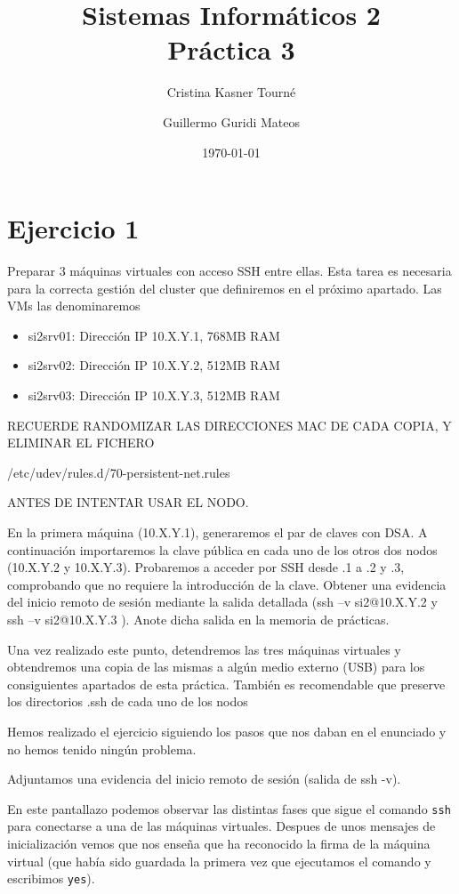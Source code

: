 \documentclass[a4paper, 10pt]{article}
\title{Sistemas Informáticos 2\\Práctica 3}
\author{Cristina Kasner Tourné\and Guillermo Guridi Mateos}
\date{\today}
\begin{document}


\section{Ejercicio 1}
\begin{mdframed}
	Preparar 3 máquinas virtuales con acceso SSH entre ellas. Esta tarea es necesaria para la
	correcta gestión del cluster que definiremos en el próximo apartado. Las VMs las denominaremos
	\begin{itemize}
		\item si2srv01: Dirección IP 10.X.Y.1, 768MB RAM
		\item si2srv02: Dirección IP 10.X.Y.2, 512MB RAM
		\item si2srv03: Dirección IP 10.X.Y.3, 512MB RAM 
	\end{itemize}
	
	RECUERDE RANDOMIZAR LAS DIRECCIONES MAC DE CADA COPIA, Y ELIMINAR EL FICHERO 
	
	/etc/udev/rules.d/70-persistent-net.rules 
	
	ANTES DE INTENTAR USAR EL NODO.
	
	
	En la primera máquina (10.X.Y.1), generaremos el par de claves con DSA. A continuación importaremos la
	clave pública en cada uno de los otros dos nodos (10.X.Y.2 y 10.X.Y.3). Probaremos a acceder por SSH
	desde .1 a .2 y .3, comprobando que no requiere la introducción de la clave. Obtener una evidencia del
	inicio remoto de sesión mediante la salida detallada (ssh –v si2@10.X.Y.2 y ssh –v si2@10.X.Y.3 ). Anote
	dicha salida en la memoria de prácticas.
	
	
	Una vez realizado este punto, detendremos las tres máquinas virtuales y obtendremos una copia de
	las mismas a algún medio externo (USB) para los consiguientes apartados de esta práctica.
	También es recomendable que preserve los directorios .ssh de cada uno de los nodos
\end{mdframed}




Hemos realizado el ejercicio siguiendo los pasos que nos daban en el enunciado y no hemos tenido ningún problema.

Adjuntamos una evidencia del inicio remoto de sesión (salida de ssh -v).

En este pantallazo podemos observar las distintas fases que sigue el comando \texttt{ssh} para conectarse a una de las máquinas virtuales. Despues de unos mensajes de inicialización vemos que nos enseña que ha reconocido la firma de la máquina virtual (que había sido guardada la primera vez que ejecutamos el comando y escribimos \texttt{yes}).
\end{document}
